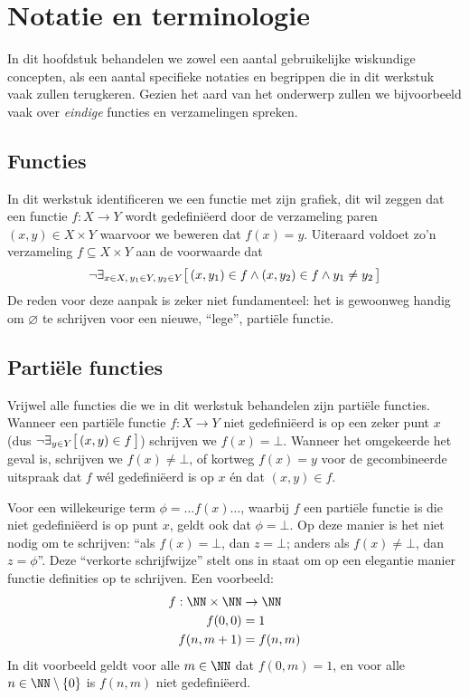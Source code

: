 \chapter{Notatie en terminologie}

In dit hoofdstuk behandelen we zowel een aantal gebruikelijke wiskundige concepten, als een aantal specifieke notaties en begrippen die in dit werkstuk vaak zullen terugkeren. Gezien het aard van het onderwerp zullen we bijvoorbeeld vaak over \emph{eindige} functies en verzamelingen spreken.

\section{Functies}

In dit werkstuk identificeren we een functie met zijn grafiek, dit wil zeggen dat een functie $f : X \to Y$ wordt gedefiniëerd door de verzameling paren $(x, y) \in X \times Y$ waarvoor we beweren dat $f(x) = y$. Uiteraard voldoet zo'n verzameling $f \subseteq X \times Y$ aan de voorwaarde dat
\begin{equation*}
  \neg \exists_{x \in X,\, y_1 \in Y,\, y_2 \in Y} \big[\, (x, y_1) \in f \land (x, y_2) \in f \land y_1 \neq y_2 \,\big]
\end{equation*}
De reden voor deze aanpak is zeker niet fundamenteel: het is gewoonweg handig om $\varnothing$ te schrijven voor een nieuwe, ``lege'', partiële functie.

\section{Partiële functies}

Vrijwel alle functies die we in dit werkstuk behandelen zijn partiële functies. Wanneer een partiële functie $f : X \to Y$ niet gedefiniëerd is op een zeker punt $x$ (dus $\neg \exists_{y \in Y} \big[\, (x, y) \in f \,\big]$) schrijven we $f(x) = \bot$. Wanneer het omgekeerde het geval is, schrijven we $f(x) \neq \bot$, of kortweg $f(x) = y$ voor de gecombineerde uitspraak dat $f$ wél gedefiniëerd is op $x$ én dat $(x, y) \in f$.

Voor een willekeurige term $\phi = \dots f(x)\dots$, waarbij $f$ een partiële functie is die niet gedefiniëerd is op punt $x$, geldt ook dat $\phi = \bot$. Op deze manier is het niet nodig om te schrijven: ``als $f(x) = \bot$, dan $z = \bot$; anders als $f(x) \neq \bot$, dan $z = \phi$''. Deze ``verkorte schrijfwijze'' stelt ons in staat om op een elegantie manier functie definities op te schrijven. Een voorbeeld:
\begin{align*}
  f : \NN \times \NN &\to \NN \\
  f(0, 0) &= 1 \\
  f(n, m + 1) &= f(n, m)
\end{align*}
In dit voorbeeld geldt voor alle $m \in \NN$ dat $f(0, m) = 1$, en voor alle $n \in \NN \setminus \{0\}$ is $f(n, m)$ niet gedefiniëerd.

